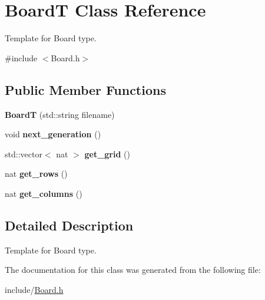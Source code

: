 \hypertarget{class_board_t}{}\section{BoardT Class Reference}
\label{class_board_t}


Template for Board type.  




{\ttfamily \#include $<$Board.\+h$>$}

\subsection*{Public Member Functions}
\begin{DoxyCompactItemize}
\item 
\mbox{\label{class_board_t_a48098b35354c080d22e0951c2daa893c}} 
{\bfseries BoardT} (std\+::string filename)
\item 
\mbox{\label{class_board_t_ad365c8569ccc5c19fd41f6cd9462aa24}} 
void {\bfseries next\+\_\+generation} ()
\item 
\mbox{\label{class_board_t_ae1a8b4a769c4c1eb47d727447a72fbe8}} 
std\+::vector$<$ nat $>$ {\bfseries get\+\_\+grid} ()
\item 
\mbox{\label{class_board_t_a6e8f541fd7459ec2418e6d18bfb22520}} 
nat {\bfseries get\+\_\+rows} ()
\item 
\mbox{\label{class_board_t_a72e70b4ca7994278e8ddeab219d31354}} 
nat {\bfseries get\+\_\+columns} ()
\end{DoxyCompactItemize}


\subsection{Detailed Description}
Template for Board type. 

The documentation for this class was generated from the following file\+:\begin{DoxyCompactItemize}
\item 
include/\hyperlink{_board_8h}{Board.\+h}\end{DoxyCompactItemize}
